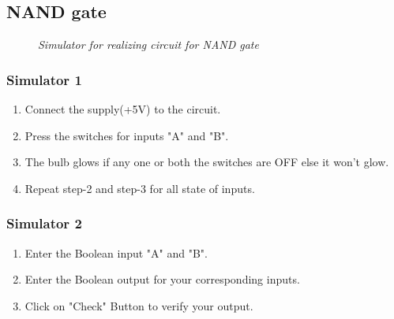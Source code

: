 	\subsection{NAND gate}
		\begin{figure}[ht]
			\centering 
			\hfill
			\caption{\textit{Simulator for realizing circuit for NAND gate}}
		\end{figure}
		\subsubsection{Simulator 1}
			\begin{enumerate}
				\tightlist
				\item Connect the supply(+5V) to the circuit.
				\item Press the switches for inputs "A" and "B".			
				\item The bulb glows if any one or both the switches are OFF else it won't glow.
				\item Repeat step-2 and step-3 for all state of inputs.
			\end{enumerate}
		\subsubsection{Simulator 2}
			\begin{enumerate}
				\tightlist
				\item Enter the Boolean input "A" and "B".
				\item Enter the Boolean output for your corresponding inputs.
				\item Click on "Check" Button to verify your output.			
			\end{enumerate}	

